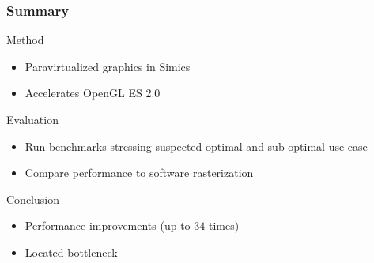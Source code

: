 \begin{frame}
\frametitle{Summary}

\begin{block}{Method}
	\begin{itemize}
		\item Paravirtualized graphics in Simics
		\item Accelerates OpenGL ES 2.0
	\end{itemize}
\end{block}

\begin{block}{Evaluation}
	\begin{itemize}
		\item Run benchmarks stressing suspected optimal and sub-optimal use-case
		\item Compare performance to software rasterization
	\end{itemize}
\end{block}

\begin{block}{Conclusion}
	\begin{itemize}
		\item Performance improvements (up to $34$ times)
		\item Located bottleneck
	\end{itemize}
\end{block}

\end{frame}
